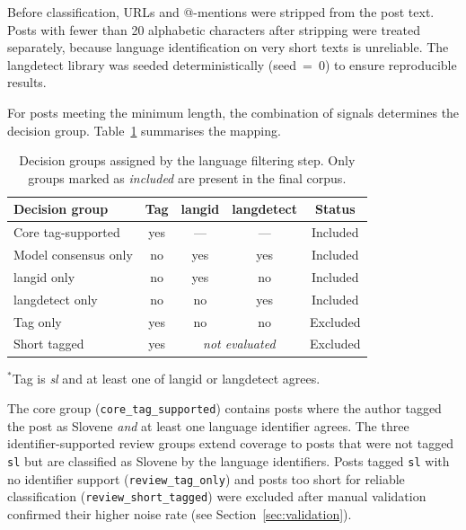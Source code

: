 Before classification, URLs and @-mentions were stripped from the post text. Posts with fewer than 20 alphabetic characters after stripping were treated separately, because language identification on very short texts is unreliable. The langdetect library was seeded deterministically (seed~=~0) to ensure reproducible results.

For posts meeting the minimum length, the combination of signals determines the decision group. Table~\ref{tab:decision-groups} summarises the mapping.

\begin{table}[htbp]
\centering
\caption{Decision groups assigned by the language filtering step. Only groups marked as \textit{included} are present in the final corpus.}
\label{tab:decision-groups}
\begin{tabularx}{\linewidth}{Xcccc}
\toprule
Decision group & Tag & langid & langdetect & Status \\
\midrule
Core tag-supported\rlap{$^*$}   & yes & ---  & ---  & Included \\
Model consensus only             & no  & yes  & yes  & Included \\
langid only                      & no  & yes  & no   & Included \\
langdetect only                  & no  & no   & yes  & Included \\
\midrule
Tag only                         & yes & no   & no   & Excluded \\
Short tagged                     & yes & \multicolumn{2}{c}{\textit{not evaluated}} & Excluded \\
\bottomrule
\end{tabularx}
\smallskip
\begin{minipage}{\linewidth}
{\footnotesize $^*$Tag is \textit{sl} and at least one of langid or langdetect agrees.}
\end{minipage}
\end{table}

The core group (\texttt{core\_tag\_supported}) contains posts where the author tagged the post as Slovene \textit{and} at least one language identifier agrees. The three identifier-supported review groups extend coverage to posts that were not tagged \texttt{sl} but are classified as Slovene by the language identifiers. Posts tagged \texttt{sl} with no identifier support (\texttt{review\_tag\_only}) and posts too short for reliable classification (\texttt{review\_short\_tagged}) were excluded after manual validation confirmed their higher noise rate (see Section~\ref{sec:validation}).

